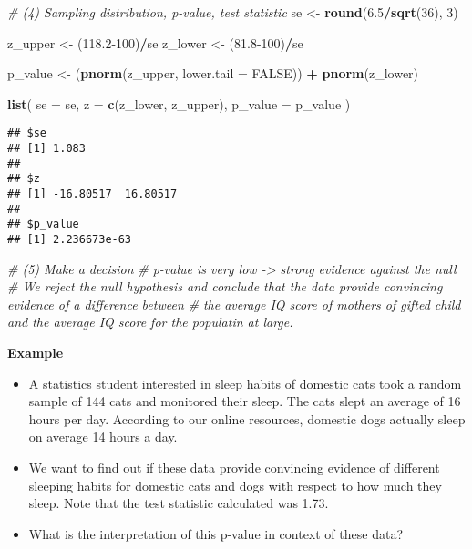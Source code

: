 \documentclass[]{book}
\newenvironment{Shaded}{\begin{snugshade}}{\end{snugshade}}
\newcommand{\CommentTok}[1]{\textcolor[rgb]{0.56,0.35,0.01}{\textit{#1}}}
\newcommand{\DataTypeTok}[1]{\textcolor[rgb]{0.13,0.29,0.53}{#1}}
\newcommand{\DecValTok}[1]{\textcolor[rgb]{0.00,0.00,0.81}{#1}}
\newcommand{\FloatTok}[1]{\textcolor[rgb]{0.00,0.00,0.81}{#1}}
\newcommand{\KeywordTok}[1]{\textcolor[rgb]{0.13,0.29,0.53}{\textbf{#1}}}
\newcommand{\NormalTok}[1]{#1}
\newcommand{\OperatorTok}[1]{\textcolor[rgb]{0.81,0.36,0.00}{\textbf{#1}}}
\newcommand{\OtherTok}[1]{\textcolor[rgb]{0.56,0.35,0.01}{#1}}
\newcommand{\StringTok}[1]{\textcolor[rgb]{0.31,0.60,0.02}{#1}}
\providecommand{\tightlist}{%
  \setlength{\itemsep}{0pt}\setlength{\parskip}{0pt}}
\begin{document}
\begin{Shaded}
\begin{Highlighting}[]
\CommentTok{# (4) Sampling distribution, p-value, test statistic}
\NormalTok{se <-}\StringTok{ }\KeywordTok{round}\NormalTok{(}\FloatTok{6.5}\OperatorTok{/}\KeywordTok{sqrt}\NormalTok{(}\DecValTok{36}\NormalTok{), }\DecValTok{3}\NormalTok{)}

\NormalTok{z_upper <-}\StringTok{ }\NormalTok{(}\FloatTok{118.2}\DecValTok{-100}\NormalTok{)}\OperatorTok{/}\NormalTok{se}
\NormalTok{z_lower <-}\StringTok{ }\NormalTok{(}\FloatTok{81.8}\DecValTok{-100}\NormalTok{)}\OperatorTok{/}\NormalTok{se}

\NormalTok{p_value <-}\StringTok{ }\NormalTok{(}\KeywordTok{pnorm}\NormalTok{(z_upper, }\DataTypeTok{lower.tail =} \OtherTok{FALSE}\NormalTok{)) }\OperatorTok{+}\StringTok{ }\KeywordTok{pnorm}\NormalTok{(z_lower)}

\KeywordTok{list}\NormalTok{(}
  \DataTypeTok{se =}\NormalTok{ se,}
  \DataTypeTok{z =} \KeywordTok{c}\NormalTok{(z_lower, z_upper),}
  \DataTypeTok{p_value =}\NormalTok{ p_value}
\NormalTok{)}
\end{Highlighting}
\end{Shaded}

\begin{verbatim}
## $se
## [1] 1.083
## 
## $z
## [1] -16.80517  16.80517
## 
## $p_value
## [1] 2.236673e-63
\end{verbatim}

\begin{Shaded}
\begin{Highlighting}[]
\CommentTok{# (5) Make a decision}
\CommentTok{# p-value is very low -> strong evidence against the null}
\CommentTok{# We reject the null hypothesis and conclude that the data provide convincing evidence of a difference between }
\CommentTok{# the average IQ score of mothers of gifted child and the average IQ score for the populatin at large.}
\end{Highlighting}
\end{Shaded}

\textbf{Example}

\begin{itemize}
\tightlist
\item
  A statistics student interested in sleep habits of domestic cats took a random sample of 144 cats and monitored their sleep. The cats slept an average of 16 hours per day. According to our online resources, domestic dogs actually sleep on average 14 hours a day.
\item
  We want to find out if these data provide convincing evidence of different sleeping habits for domestic cats and dogs with respect to how much they sleep. Note that the test statistic calculated was 1.73.
\item
  What is the interpretation of this p-value in context of these data?
\end{itemize}
\end{document}
